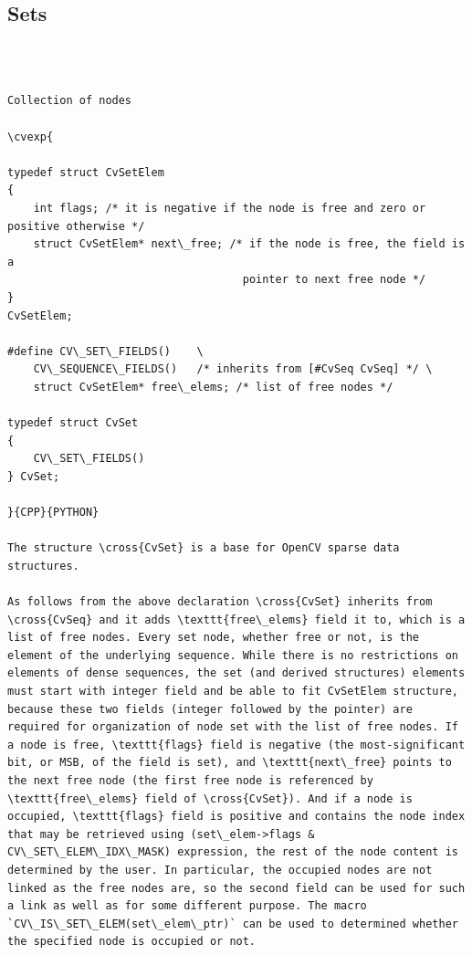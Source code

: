 \subsection{Sets}
\begin{verbatim}


\end{verbatim}
\label{CvSet}
\begin{verbatim}

Collection of nodes

\cvexp{

typedef struct CvSetElem
{
    int flags; /* it is negative if the node is free and zero or positive otherwise */
    struct CvSetElem* next\_free; /* if the node is free, the field is a
                                    pointer to next free node */
}
CvSetElem;

#define CV\_SET\_FIELDS()    \
    CV\_SEQUENCE\_FIELDS()   /* inherits from [#CvSeq CvSeq] */ \
    struct CvSetElem* free\_elems; /* list of free nodes */

typedef struct CvSet
{
    CV\_SET\_FIELDS()
} CvSet;

}{CPP}{PYTHON}

The structure \cross{CvSet} is a base for OpenCV sparse data structures.

As follows from the above declaration \cross{CvSet} inherits from \cross{CvSeq} and it adds \texttt{free\_elems} field it to, which is a list of free nodes. Every set node, whether free or not, is the element of the underlying sequence. While there is no restrictions on elements of dense sequences, the set (and derived structures) elements must start with integer field and be able to fit CvSetElem structure, because these two fields (integer followed by the pointer) are required for organization of node set with the list of free nodes. If a node is free, \texttt{flags} field is negative (the most-significant bit, or MSB, of the field is set), and \texttt{next\_free} points to the next free node (the first free node is referenced by \texttt{free\_elems} field of \cross{CvSet}). And if a node is occupied, \texttt{flags} field is positive and contains the node index that may be retrieved using (set\_elem->flags & CV\_SET\_ELEM\_IDX\_MASK) expression, the rest of the node content is determined by the user. In particular, the occupied nodes are not linked as the free nodes are, so the second field can be used for such a link as well as for some different purpose. The macro `CV\_IS\_SET\_ELEM(set\_elem\_ptr)` can be used to determined whether the specified node is occupied or not.


\end{verbatim}
